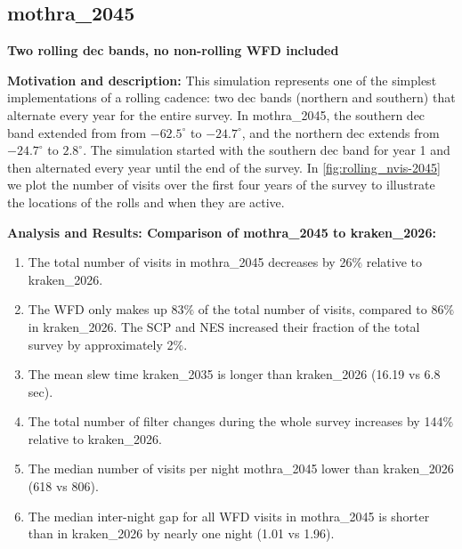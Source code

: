 \documentclass[DM,authoryear,toc]{lsstdoc}
\begin{document}
\subsection{mothra\_2045} \label{mothra2045}

\textbf{Two rolling dec bands, no non-rolling WFD included}

\textbf{Motivation and description:} This simulation represents one of the simplest implementations of a rolling cadence:
two dec bands (northern and southern) that alternate every year for the entire survey. In mothra\_2045, the southern dec band extended from
from $-62.5^{\circ}$ to $-24.7^{\circ}$, and the northern dec extends from $-24.7^{\circ}$ to $2.8^{\circ}$. The simulation started with
the southern dec band for year 1 and then alternated every year until the end of the survey. In \autoref{fig:rolling_nvis-2045}
we plot the number of visits over the first four years of the survey to illustrate the locations of the rolls and when they are active.

\textbf{Analysis and Results: Comparison of mothra\_2045 to kraken\_2026:}

\begin{enumerate}
\item The total number of visits in mothra\_2045 decreases by 26$\%$ relative to kraken\_2026.
\item The WFD only makes up 83$\%$ of the total number of visits, compared to 86$\%$ in kraken\_2026.
The SCP and NES increased their fraction of the total survey by approximately 2$\%$.
\item The mean slew time kraken\_2035 is longer than kraken\_2026 (16.19 vs 6.8 sec).
\item The total number of filter changes during the whole survey increases by 144$\%$ relative to kraken\_2026.
\item The median number of visits per night mothra\_2045 lower than kraken\_2026 (618 vs 806).
\item The median inter-night gap for all WFD visits in mothra\_2045 is shorter than in kraken\_2026 by nearly one night (1.01 vs 1.96).
\end{enumerate}
\end{document}
